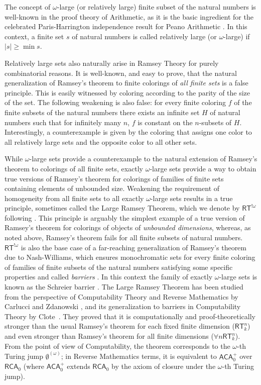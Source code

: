 \documentclass{article}
\newcommand{\RCA}[0]{\mathsf{RCA}}
\newcommand{\ACA}[0]{\mathsf{ACA}}
\newcommand{\RT}[0]{\mathsf{RT}}
\numberwithin{theorem}{section}
\begin{document}
The concept of $\omega$-large (or relatively large) finite subset of the natural numbers is well-known in the proof theory of Arithmetic, as it is the basic ingredient for the celebrated Paris-Harrington independence result for Peano Arithmetic \cite{Paris1977-PARAMI}. In this context, a finite set $s$ of natural numbers is called relatively large (or $\omega$-large) if $|s| \geq \min s$.

Relatively large sets also naturally arise in Ramsey Theory for purely combinatorial reasons. It is well-known, and easy to prove, that the natural generalization of Ramsey's theorem to finite colorings of {\em all finite sets} is a false principle. This is easily witnessed by coloring according to the parity of the size of the set. The following weakening is also false: for every finite coloring $f$ of the finite subsets of the natural numbers there exists an infinite set $H$ of natural numbers such that for infinitely many $n$, $f$ is constant on the $n$-subsets of $H$. Interestingly, a counterexample is given by the coloring that assigns one color to all relatively large sets and the opposite color to all other sets.

While $\omega$-large sets provide a counterexample to the natural extension of Ramsey's theorem to colorings of all finite sets, exactly $\omega$-large sets provide a way to obtain true versions of Ramsey's theorem for colorings of families of finite sets containing elements of unbounded size. Weakening the requirement of homogeneity from all finite sets to all exactly $\omega$-large sets results in a true principle, sometimes called the Large Ramsey Theorem, which we denote by $\RT^{!\omega}$ following \cite{carlucci2014strength}. This principle is arguably the simplest example of a true version of Ramsey's theorem for colorings of objects of {\em unbounded dimensions}, whereas, as noted above, Ramsey's theorem fails for all finite subsets of natural numbers. $\RT^{!\omega}$ is also the base case of a far-reaching generalization of Ramsey's theorem due to Nash-Williams, which ensures monochromatic sets for every finite coloring of families of finite subsets of the natural numbers satisfying some specific properties and called {\em barriers} \cite{Todorcevic+2010}. In this context the family of exactly $\omega$-large sets is known as the Schreier barrier \cite{Todorcevic+2010}.
The Large Ramsey Theorem has been studied from the perspective of Computability Theory and Reverse Mathematics by Carlucci and Zdanowski \cite{carlucci2014strength}, and its generalization to barriers in Computability Theory by Clote~\cite{clote1984recursion}. They proved that it is computationally and proof-theoretically stronger than the usual Ramsey's theorem for each fixed finite dimension ($\RT^n_k$) and even stronger than Ramsey's theorem for all finite dimensions ($\forall n \RT^n_k$). From the point of view of Computability, the theorem corresponds to the $\omega$-th Turing jump $\emptyset^{(\omega)}$; in Reverse Mathematics terms, it is equivalent to $\ACA_0^+$ over $\RCA_0$ (where $\ACA_0^+$ extends $\RCA_0$ by the axiom of closure under the $\omega$-th Turing jump).
\end{document}
